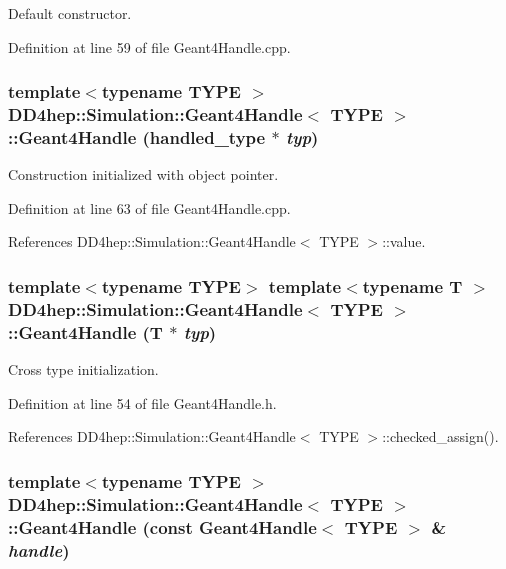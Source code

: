 Default constructor. 

Definition at line 59 of file Geant4Handle.cpp.\hypertarget{class_d_d4hep_1_1_simulation_1_1_geant4_handle_a82201301931f3fc74f9ad0c4fe6b9071}{
\subsubsection[{Geant4Handle}]{\setlength{\rightskip}{0pt plus 5cm}template$<$typename TYPE $>$ {\bf DD4hep::Simulation::Geant4Handle}$<$ TYPE $>$::{\bf Geant4Handle} ({\bf handled\_\-type} $\ast$ {\em typ})}}
\label{class_d_d4hep_1_1_simulation_1_1_geant4_handle_a82201301931f3fc74f9ad0c4fe6b9071}


Construction initialized with object pointer. 

Definition at line 63 of file Geant4Handle.cpp.

References DD4hep::Simulation::Geant4Handle$<$ TYPE $>$::value.\hypertarget{class_d_d4hep_1_1_simulation_1_1_geant4_handle_abdd84b393cb29237c0511a773e270ffc}{
\subsubsection[{Geant4Handle}]{\setlength{\rightskip}{0pt plus 5cm}template$<$typename TYPE$>$ template$<$typename T $>$ {\bf DD4hep::Simulation::Geant4Handle}$<$ TYPE $>$::{\bf Geant4Handle} ({\bf T} $\ast$ {\em typ})}}
\label{class_d_d4hep_1_1_simulation_1_1_geant4_handle_abdd84b393cb29237c0511a773e270ffc}


Cross type initialization. 

Definition at line 54 of file Geant4Handle.h.

References DD4hep::Simulation::Geant4Handle$<$ TYPE $>$::checked\_\-assign().\hypertarget{class_d_d4hep_1_1_simulation_1_1_geant4_handle_a285188049a0dfb7e4129c2ba4556c105}{
\subsubsection[{Geant4Handle}]{\setlength{\rightskip}{0pt plus 5cm}template$<$typename TYPE $>$ {\bf DD4hep::Simulation::Geant4Handle}$<$ TYPE $>$::{\bf Geant4Handle} (const {\bf Geant4Handle}$<$ TYPE $>$ \& {\em handle})}}
\label{class_d_d4hep_1_1_simulation_1_1_geant4_handle_a285188049a0dfb7e4129c2ba4556c105}


